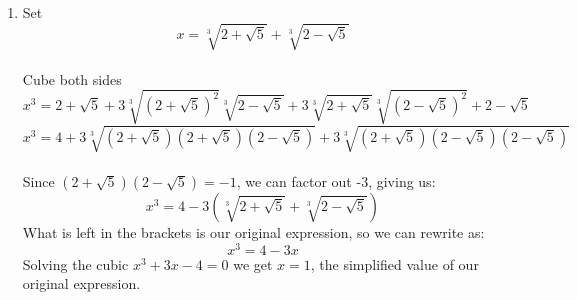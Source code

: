 \documentclass[../main.tex]{subfiles}
\begin{document}
\begin{enumerate}
    \((a+b)^2=(a-b)^2+(x+y)^2\)\\
    \((a+b)^2=(a-b)^2+(2\sqrt{br}+2\sqrt{ar})^2\)\\
    \(a^2+b^2+2ab=a^2-2ab+b^2+4br+4ar+8\sqrt{abr^2}\)\\
    \(4ab=4br+4ar+8\sqrt{abr^2}\)\\
    \(ab=br+ar+2\sqrt{abr^2}\)\\
    \(ab=br+ar+2r\sqrt{ab}\)\\
    \(ab=r(a+b+2\sqrt{ab}\)\\
    \(ab=r(\sqrt{a}+\sqrt{b})^2\)\\

    Rearranging:\\
    \(\frac{1}{r}=\frac{(\sqrt{a}+\sqrt{b})^2}{ab}\)\\
    \(\frac{1}{\sqrt{r}}=\frac{\sqrt{a}+\sqrt{b}}{\sqrt{ab}}\)\\
    \(\frac{1}{\sqrt{r}}=\frac{\sqrt{a}}{\sqrt{a}\sqrt{b}}+\frac{\sqrt{b}}{\sqrt{a}\sqrt{b}}\)\\
    \(\frac{1}{\sqrt{r}}=\frac{1}{\sqrt{a}}+\frac{1}{\sqrt{b}}\)\\
    As required. 
    
    \item
    Set \[x = \sqrt[3]{2+\sqrt{5}} + \sqrt[3]{2-\sqrt{5}}\]\\
    Cube both sides
    \[x^3 = 2+\sqrt{5}+3\sqrt[3]{(2+\sqrt{5})^{2}}\sqrt[3]{2-\sqrt{5}}+3\sqrt[3]{2+\sqrt{5}}\sqrt[3]{(2-\sqrt{5})^2}+2-\sqrt{5}\]
    \[x^3 = 4 + 3\sqrt[3]{(2+\sqrt{5})(2+\sqrt{5})(2-\sqrt{5})}+3\sqrt[3]{(2+\sqrt{5})(2-\sqrt{5})(2-\sqrt{5})}\]\\
    Since $(2+\sqrt{5})(2-\sqrt{5})=-1$, we can factor out {-3}, giving us:\\
    \[x^3 = 4 - 3(\sqrt[3]{2+\sqrt{5}}+\sqrt[3]{2-\sqrt{5}})\]
    What is left in the brackets is our original expression, so we can rewrite as:
    \[x^3 = 4-3x\]
    Solving the cubic $x^3+3x-4=0$ we get $x=1$, the simplified value of our original expression.
    



\end{enumerate}
\end{document}
